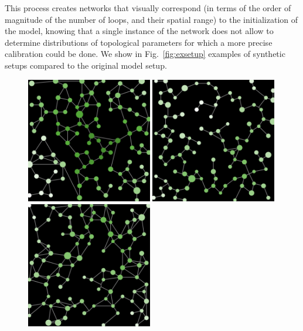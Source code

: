 \documentclass[graybox]{svmult}
\begin{document}
This process creates networks that visually correspond (in terms of the order of magnitude of the number of loops, and their spatial range) to the initialization of the model, knowing that a single instance of the network does not allow to determine distributions of topological parameters for which a more precise calibration could be done. We show in Fig.~\ref{fig:exsetup} examples of synthetic setups compared to the original model setup.


\begin{figure}
	\centering
	\includegraphics[width=0.49\textwidth]{setup_stylized.png}\hspace{0.1cm}
	\includegraphics[width=0.49\textwidth]{setup_synth_0.png}\\\vspace{0.1cm}
	\includegraphics[width=0.49\textwidth]{setup_synth_1.png}\hspace{0.1cm}

\end{figure}
\end{document}

